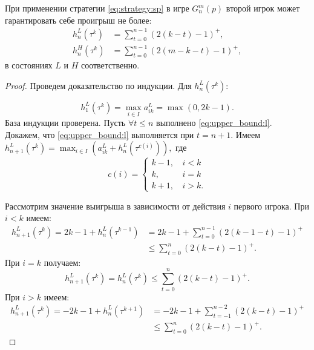 \begin{utver}
При применении стратегии \eqref{eq:strategy:sp} в игре $ G_n^m(p) $ второй игрок может гарантировать себе проигрыш не более:
\begin{align}
\label{eq:upper_bound:l}
h_n^L(\tau^k) &= \sum_{t=0}^{n-1}
    (2(k - t) - 1)^+,\\
\label{eq:upper_bound:h}
h_n^H(\tau^k) &= \sum_{t=0}^{n-1}
    (2(m - k - t) - 1)^+,
\end{align}
в состояниях $ L $ и $ H $ соответственно.
\end{utver}
\begin{proof}
Проведем доказательство по индукции.
Для $ h_n^L(\tau^k) $:

\[ 
h_1^L(\tau^k) = \max_{i \in I} a_{ik}^L = \max(0, 2k - 1).
\]
База индукции проверена.
Пусть $ \forall t \leq n $ выполнено \eqref{eq:upper_bound:l}. 
Докажем, что \eqref{eq:upper_bound:l} выполняется при $ t=n+1 $. Имеем
$
h_{n+1}^L(\tau^k) = \max_{i \in I} (a_{ik}^L + h_n^L(\tau^{c(i)})),
$
где
\[ 
c(i) = \begin{cases}
    k - 1, &\, i < k \\
    k, &\, i = k \\
    k + 1, &\, i > k.
\end{cases}
\]

Рассмотрим значение выигрыша в зависимости от действия $ i $ первого игрока. 
При $ i < k $ имеем:
\begin{align*}
  h_{n+1}^L(\tau^k) = 2k - 1 + h_n^L(\tau^{k-1}) &= 2k - 1 + \sum_{t = 0}^{n-1} (2(k-1-t)-1)^+ \\
  &\leq \sum_{t = 0}^n (2(k-t) - 1)^+.
\end{align*}
При $ i = k $ получаем:
\[
  h_{n+1}^L(\tau^k) = h_n^L(\tau^k) \leq \sum_{t=0}^n(2(k-t)-1)^+.
\]
При $ i > k $ имеем:
\begin{align*}
  h_{n+1}^L(\tau^k) = -2k - 1 + h_n^L(\tau^{k+1}) &= -2k - 1 + \sum_{t = -1}^{n-2} (2(k-t)-1)^+ \\
  &\leq \sum_{t=0}^n(2(k-t)-1)^+.
\end{align*}


\end{proof}
